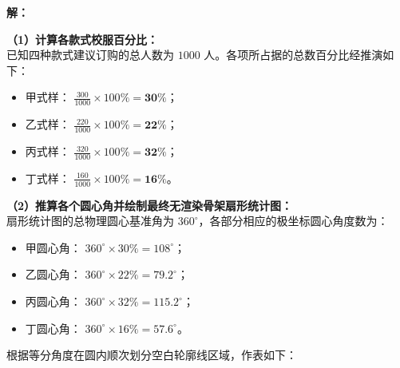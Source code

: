 \vspace{0.4cm}

\textbf{解：}

\textbf{（1）计算各款式校服百分比：} \\
已知四种款式建议订购的总人数为 $1000$ 人。各项所占据的总数百分比经推演如下：
\begin{itemize}
  \item 甲式样： $\frac{300}{1000} \times 100\% = \boldsymbol{30\%}$；
  \item 乙式样： $\frac{220}{1000} \times 100\% = \boldsymbol{22\%}$；
  \item 丙式样： $\frac{320}{1000} \times 100\% = \boldsymbol{32\%}$；
  \item 丁式样： $\frac{160}{1000} \times 100\% = \boldsymbol{16\%}$。
\end{itemize}

\textbf{（2）推算各个圆心角并绘制最终无渲染骨架扇形统计图：} \\
扇形统计图的总物理圆心基准角为 $360^\circ$，各部分相应的极坐标圆心角度数为：
\begin{itemize}
  \item 甲圆心角： $360^\circ \times 30\% = 108^\circ$；
  \item 乙圆心角： $360^\circ \times 22\% = 79.2^\circ$；
  \item 丙圆心角： $360^\circ \times 32\% = 115.2^\circ$；
  \item 丁圆心角： $360^\circ \times 16\% = 57.6^\circ$。
\end{itemize}

根据等分角度在圆内顺次划分空白轮廓线区域，作表如下：


